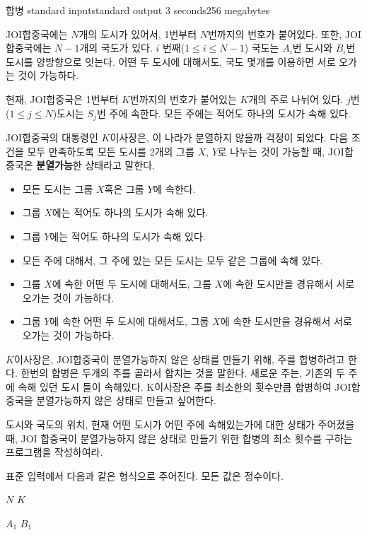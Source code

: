\begin{problem}{합병}
	{standard input}{standard output}
	{3 seconds}{256 megabytes}{}
	
	JOI합중국에는 $N$개의 도시가 있어서, 1번부터 $N$번까지의 번호가 붙어있다. 또한, JOI합중국에는 $N-1$개의 국도가 있다. $i$ 번째($1 \le i \le N-1$) 국도는 $A_i$번 도시와 $B_i$번 도시를 양방향으로 잇는다. 어떤 두 도시에 대해서도, 국도 몇개를 이용하면 서로 오가는 것이 가능하다.
	
	현재, JOI합중국은 1번부터 $K$번까지의 번호가 붙어있는 $K$개의 주로 나뉘어 있다. $j$번 ($1 \le j \le N$)도시는 $S_j$번 주에 속한다. 모든 주에는 적어도 하나의 도시가 속해 있다.
	
	JOI합중국의 대통령인 $K$이사장은, 이 나라가 분열하지 않을까 걱정이 되었다. 다음 조건을 모두 만족하도록 모든 도시를 2개의 그룹 $X$, $Y$로 나누는 것이 가능할 때, JOI합중국은 \textbf{분열가능}한 상태라고 말한다.
	
	\begin{itemize}
		\item 모든 도시는 그룹 $X$혹은 그룹 $Y$에 속한다.
		\item 그룹 $X$에는 적어도 하나의 도시가 속해 있다.
		\item 그룹 $Y$에는 적어도 하나의 도시가 속해 있다.
		\item 모든 주에 대해서, 그 주에 있는 모든 도시는 모두 같은 그룹에 속해 있다.
		\item 그룹 $X$에 속한 어떤 두 도시에 대해서도, 그룹 $X$에 속한 도시만을 경유해서 서로 오가는 것이 가능하다.
		\item 그룹 $Y$에 속한 어떤 두 도시에 대해서도, 그룹 $X$에 속한 도시만을 경유해서 서로 오가는 것이 가능하다.
	\end{itemize}

	$K$이사장은, JOI합중국이 분열가능하지 않은 상태를 만들기 위해, 주를 합병하려고 한다. 한번의 합병은 두개의 주를 골라서 합치는 것을 말한다. 새로운 주는, 기존의 두 주에 속해 있던 도시 들이 속해있다. K이사장은 주를 최소한의 횟수만큼 합병하여 JOI합중국을 분열가능하지 않은 상태로 만들고 싶어한다.
	
	도시와 국도의 위치, 현재 어떤 도시가 어떤 주에 속해있는가에 대한 상태가 주어졌을 때, JOI 합중국이 분열가능하지 않은 상태로 만들기 위한 합병의 최소 횟수를 구하는 프로그램을 작성하여라.
	
	\InputFile
	
	표준 입력에서 다음과 같은 형식으로 주어진다. 모든 값은 정수이다.
	
	$N$ $K$
	
	$A_1$ $B_1$
	

\end{problem}
